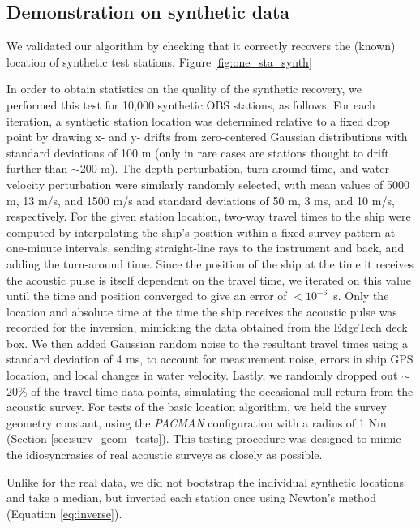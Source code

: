 
\subsection{Demonstration on synthetic data}
We validated our algorithm by checking that it correctly recovers the (known) location of synthetic test stations. Figure \ref{fig:one_sta_synth} 

In order to obtain statistics on the quality of the synthetic recovery, we performed this test for 10,000 synthetic OBS stations, as follows: For each iteration, a synthetic station location was determined relative to a fixed drop point by drawing x- and y- drifts from zero-centered Gaussian distributions with standard deviations of 100 m (only in rare cases are stations thought to drift further than $\sim$200 m). The depth perturbation, turn-around time, and water velocity perturbation were similarly randomly selected, with mean values of 5000 m, 13 m/s, and 1500 m/s and standard deviations of 50 m, 3 ms, and 10 m/s, respectively. For the given station location, two-way travel times to the ship were computed by interpolating the ship's position within a fixed survey pattern at one-minute intervals, sending straight-line rays to the instrument and back, and adding the turn-around time. Since the position of the ship at the time it receives the acoustic pulse is itself dependent on the travel time, we iterated on this value until the time and position converged to give an error of \mbox{$<10^{-6}$ s}. Only the location and absolute time at the time the ship receives the acoustic pulse was recorded for the inversion, mimicking the data obtained from the EdgeTech deck box. We then added Gaussian random noise to the resultant travel times using a standard deviation of 4 ms, to account for measurement noise, errors in ship GPS location, and local changes in water velocity. Lastly, we randomly dropped out $\sim$20\% of the travel time data points, simulating the occasional null return from the acoustic survey. For tests of the basic location algorithm, we held the survey geometry constant, using the \textit{PACMAN} configuration with a radius of 1 Nm (Section \ref{sec:surv_geom_tests}). This testing procedure was designed to mimic the idiosyncrasies of real acoustic surveys as closely as possible. 

Unlike for the real data, we did not bootstrap the individual synthetic locations and take a median, but inverted each station once using Newton's method (Equation \ref{eq:inverse}).   

